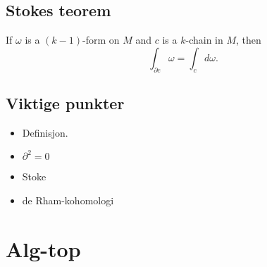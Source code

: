 \documentclass[11pt, english]{article}
\begin{document}
\subsection{Stokes teorem}

\begin{thm}[Stoke]
If $\omega$ is a $(k-1)$-form on $M$ and $c$ is a $k$-chain in $M$, then
$$
\int_{\partial c} \omega = \int_c d \omega.
$$
\end{thm}

\subsection{Viktige punkter}

\begin{itemize}
\item Definisjon.
\item $\partial^2=0$
\item Stoke
\item de Rham-kohomologi
\end{itemize}


\section{Alg-top}
\end{document}
